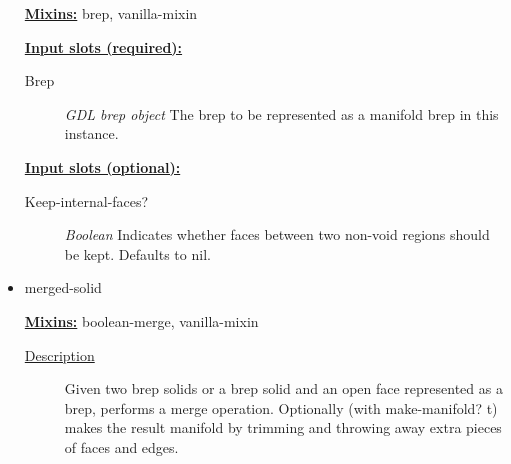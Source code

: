 \documentclass [11pt]{book}
\begin{document}
\begin{itemize}
\textbf{
\underline{Mixins:}} brep, vanilla-mixin





\begin{description}

\end{description}








\textbf{
\underline{Input slots (required):}}

\begin{description}

\item [Brep]
\emph{GDL brep object} The brep to be represented as a manifold brep in this instance.


\end{description}






\textbf{
\underline{Input slots (optional):}}

\begin{description}

\item [Keep-internal-faces?]
\emph{Boolean} Indicates whether faces between two non-void regions should be kept.
Defaults to nil.


\end{description}







\item {}merged-solid


\textbf{
\underline{Mixins:}} boolean-merge, vanilla-mixin





\begin{description}

\item [
\underline{Description}]


Given two brep solids or a brep solid and an open face represented as a brep,
performs a merge operation. Optionally (with make-manifold? t) makes the result manifold by trimming 
and throwing away extra pieces of faces and edges.



\end{description}









\end{itemize}
\end{document}
